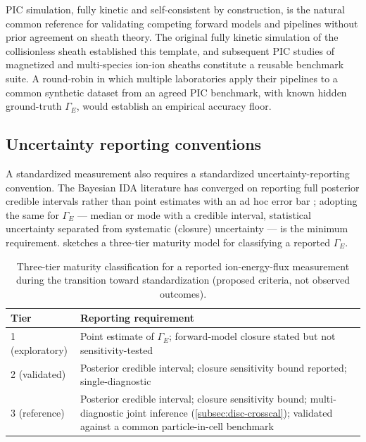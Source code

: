 PIC simulation, fully kinetic and self-consistent by construction, is the natural common reference for validating competing forward models and pipelines without prior agreement on sheath theory. The original fully kinetic simulation of the collisionless sheath \cite{ref0631} established this template, and subsequent PIC studies of magnetized \cite{ref0633} and multi-species ion-ion sheaths \cite{ref0655} constitute a reusable benchmark suite. A round-robin in which multiple laboratories apply their pipelines to a common synthetic dataset from an agreed PIC benchmark, with known hidden ground-truth $\Gamma_{E}$, would establish an empirical accuracy floor.

\subsection{Uncertainty reporting conventions}

A standardized measurement also requires a standardized uncertainty-reporting convention. The Bayesian IDA literature has converged on reporting full posterior credible intervals rather than point estimates with an ad hoc error bar \cite{ref0706,ref0713}; adopting the same for $\Gamma_{E}$ — median or mode with a credible interval, statistical uncertainty separated from systematic (closure) uncertainty — is the minimum requirement.  sketches a three-tier maturity model for classifying a reported $\Gamma_{E}$.

\begin{table}[htbp]
\centering
\caption{Three-tier maturity classification for a reported ion-energy-flux measurement during the transition toward standardization (proposed criteria, not observed outcomes).}
\label{tab:disc-standard-tiers}
\begin{tabularx}{\linewidth}{@{}l X@{}}
\toprule
Tier & Reporting requirement \\
\midrule
1 (exploratory) & Point estimate of $\Gamma_{E}$; forward-model closure stated but not sensitivity-tested \\
2 (validated) & Posterior credible interval; closure sensitivity bound reported; single-diagnostic \\
3 (reference) & Posterior credible interval; closure sensitivity bound; multi-diagnostic joint inference (\cref{subsec:disc-crosscal}); validated against a common particle-in-cell benchmark \\
\bottomrule
\end{tabularx}
\end{table}

